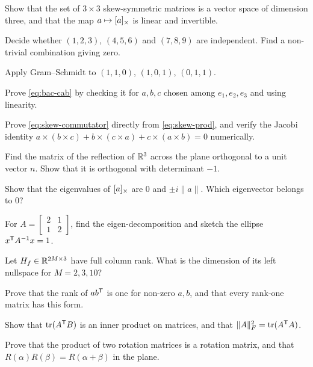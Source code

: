 \begin{exercises}
  \item Show that the set of $3\times3$ skew-symmetric matrices is a vector space of dimension three, and that the map
        $a \mapsto [a]_{\times}$ is linear and invertible.
  \item Decide whether $(1, 2, 3)$, $(4, 5, 6)$ and $(7, 8, 9)$ are independent. Find a non-trivial combination giving zero.
  \item Apply Gram--Schmidt to $(1, 1, 0)$, $(1, 0, 1)$, $(0, 1, 1)$.
  \item Prove \eqref{eq:bac-cab} by checking it for $a, b, c$ chosen among $e_1, e_2, e_3$ and using linearity.
  \item Prove \eqref{eq:skew-commutator} directly from \eqref{eq:skew-prod}, and verify the Jacobi identity
        $a\times(b\times c) + b\times(c\times a) + c\times(a\times b) = 0$ numerically.
  \item Find the matrix of the reflection of $\mathbb{R}^3$ across the plane orthogonal to a unit vector $n$. Show that it is
        orthogonal with determinant $-1$.
  \item Show that the eigenvalues of $[a]_{\times}$ are $0$ and $\pm i\|a\|$. Which eigenvector belongs to $0$?
  \item For $A = \begin{bmatrix}2 & 1\\1 & 2\end{bmatrix}$, find the eigen-decomposition and sketch the ellipse $x^{\mathsf{T}} A^{-1} x = 1$.
  \item Let $H_f \in \mathbb{R}^{2M\times3}$ have full column rank. What is the dimension of its left nullspace for $M = 2, 3, 10$?
  \item Prove that the rank of $ab^{\mathsf{T}}$ is one for non-zero $a, b$, and that every rank-one matrix has this form.
  \item Show that $\operatorname{tr}(A^{\mathsf{T}} B)$ is an inner product on matrices, and that $\|A\|_F^2 = \operatorname{tr}(A^{\mathsf{T}} A)$.
  \item Prove that the product of two rotation matrices is a rotation matrix, and that $R(\alpha)R(\beta) = R(\alpha + \beta)$ in the plane.
\end{exercises}

